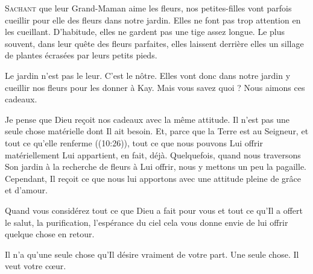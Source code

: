 


\lettrine{S}{achant} que leur Grand-Maman aime les fleurs, nos petites-filles
 vont parfois cueillir pour elle des fleurs dans notre jardin.
 Elles ne font pas trop attention en les cueillant.
 D'habitude, elles ne gardent pas une tige assez longue.
 Le plus souvent, dans leur quête des fleurs parfaites, elles laissent derrière
 elles un sillage de plantes écrasées par leurs petits pieds.

Le jardin n'est pas le leur. C'est le nôtre. Elles vont donc dans notre jardin
 y cueillir nos fleurs pour les donner à Kay.
 Mais vous savez quoi ? Nous aimons ces cadeaux.

Je pense que Dieu re\c{c}oit nos cadeaux avec la même attitude.
 Il n'est pas une seule chose matérielle dont Il ait besoin.
 Et, parce que \Og la Terre est au Seigneur, et tout ce qu'elle renferme \Fg{}
 ((10:26)), tout ce que nous pouvons Lui offrir matériellement
 Lui appartient, en fait, déjà. Quelquefois, quand nous traversons Son jardin
 à la recherche de fleurs à Lui offrir, nous y mettons un peu la pagaille.
 Cependant, Il re\c{c}oit ce que nous lui apportons avec une attitude
 pleine de grâce et d'amour.

Quand vous considérez tout ce que Dieu a fait pour vous
 et tout ce qu'Il a offert \ocadr le salut, la purification,
 l'espérance du ciel \fcadr{} cela vous donne envie de lui offrir
 quelque chose en retour.


Il n'a qu'une seule chose qu'Il désire vraiment de votre part.
 Une seule chose. Il veut votre c\oe{}ur. 

\dvrule





